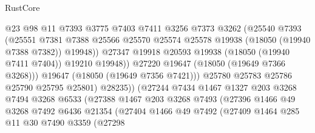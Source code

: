 \begin{lexlean}{RustCore}
\begin{coremodule}
                                @23
                                @98
                                @11
                                @7393
                                @3775
                                @7403
                                @7411
                                @3256
                                @7373
                                @3262
                                (@25540
                                  @7393
                                  (@25551
                                    @7381
                                    @7388
                                    @25566
                                    @25570
                                    @25574
                                    @25578
                                    @19938
                                    (@18050 (@19940 @7388 @7382))
                                    @19948))
                                @27347
                                @19918
                                @20593
                                @19938
                                (@18050 (@19940 @7411 @7404))
                                @19210
                                @19948))
                            @27220
                            @19647
                            (@18050 (@19649 @7366 @3268)))
                          @19647
                          (@18050 (@19649 @7356 @7421)))
                        @25780
                        @25783
                        @25786
                        @25790
                        @25795
                        @25801)
                      @28235))
                  (@27244
                    @7434
                    @1467
                    @1327
                    @203
                    @3268
                    @7494
                    @3268
                    @6533
                    (@27388
                      @1467
                      @203
                      @3268
                      @7493
                      (@27396
                        @1466
                        @49
                        @3268
                        @7492
                        @6436
                        @21354
                        (@27404
                          @1466
                          @49
                          @7492
                          (@27409
                            @1464
                            @285
                            @11
                            @30
                            @7490
                            @3359
                            (@27298

\end{coremodule}
\end{lexlean}
